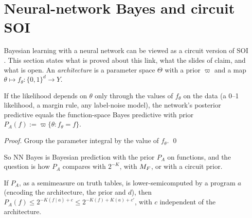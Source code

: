 \section{Neural-network Bayes and circuit SOI}\label{sec:nn}

Bayesian learning with a neural network can be viewed as a circuit version of SOI \citep{vaintrobhanni2026nnbayes}. This section states what is proved about this link, what the slides of \citet{vaintrobhanni2026nnbayes} claim, and what is open. An \emph{architecture} is a parameter space $\Theta$ with a prior $\varpi$ and a map $\theta\mapsto f_\theta:\{0,1\}^d\to Y$.

\begin{proposition}\label{prop:nn:functionspace}
If the likelihood depends on $\theta$ only through the values of $f_\theta$ on the data (a 0--1 likelihood, a margin rule, any label-noise model), the network's posterior predictive equals the function-space Bayes predictive with prior $P_A(f):=\varpi\{\theta:f_\theta=f\}$.
\end{proposition}

\emph{Proof.} Group the parameter integral by the value of $f_\theta$. \qed

So NN Bayes is Bayesian prediction with the prior $P_A$ on functions, and the question is how $P_A$ compares with $2^{-K}$, with $M_{F}$, or with a circuit prior.

\begin{proposition}\label{prop:nn:upper}
If $P_A$, as a semimeasure on truth tables, is lower-semicomputed by a program $a$ (encoding the architecture, the prior and $d$), then $P_A(f)\le2^{-K(f\mid a)+c}\le2^{-K(f)+K(a)+c'}$, with $c$ independent of the architecture.
\end{proposition}

